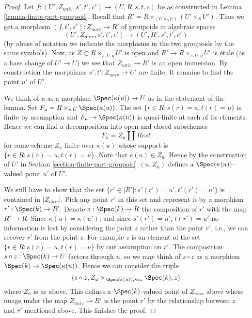 \begin{proof}
Let $f : (U', Z_{univ}, s', t', c') \to (U, R, s, t, c)$ be as constructed in
Lemma \ref{lemma-finite-part-groupoid}.
Recall that $R' = R \times_{(U \times_S U)} (U' \times_S U')$.
Thus we get a morphism $(f, t', s') : Z_{univ} \to R'$ of groupoids
in algebraic spaces
$$
(U', Z_{univ}, s', t', c') \to (U', R', s', t', c')
$$
(by abuse of notation we indicate the morphisms in the two groupoids
by the same symbols). Now, as $Z \subset R \times_{s, U, g} U'$ is open
and $R' \to R \times_{s, U, g} U'$ is \'etale (as a base change
of $U' \to U$) we see that $Z_{univ} \to R'$ is an open immersion.
By construction the morphisms $s', t' : Z_{univ} \to U'$ are finite.
It remains to find the point $u'$ of $U'$.

\medskip\noindent
We think of $u$ as a morphism $\Spec(\kappa(u)) \to U$ as in
the statement of the lemma. Set $F_u = R \times_{s, U} \Spec(\kappa(u))$.
The set $\{r \in R : s(r) = u, t(r) = u\}$ is finite by assumption
and $F_u \to \Spec(\kappa(u))$ is quasi-finite at each
of its elements. Hence we can find a decomposition into open and closed
subschemes
$$
F_u = Z_u \coprod Rest
$$
for some scheme $Z_u$ finite over $\kappa(u)$ whose support is
$\{r \in R : s(r) = u, t(r) = u\}$. Note that $e(u) \in Z_u$.
Hence by the construction of $U'$ in
Section \ref{section-finite-part-groupoid}
$(u, Z_u)$ defines a $\Spec(\kappa(u))$-valued
point $u'$ of $U'$.

\medskip\noindent
We still have to show that the set
$\{r' \in |R'| : s'(r') = u', t'(r') = u'\}$
is contained in $|Z_{univ}|$.
Pick any point $r'$ in this set and represent it by a morphism
$r' : \Spec(k) \to R'$. Denote $z : \Spec(k) \to R$
the composition of $r'$ with the map $R' \to R$.
Since $\kappa(u) = \kappa(u')$, and since $s'(r') = u'$, $t(r') = u'$
no information is lost by considering the point $z$ rather than the
point $r'$, i.e., we can recover $r'$ from the point $z$.
For example $z$ is an element of the set $\{r \in R : s(r) = u, t(r) = u\}$
by our assumption on $r'$. The composition
$s \circ z : \Spec(k) \to U$ factors through $u$, so we may
think of $s \circ z$ as a morphism $\Spec(k) \to \Spec(\kappa(u))$.
Hence we can consider the triple
$$
(s \circ z, Z_u \times_{\Spec(\kappa(u)), s \circ z} \Spec(k), z)
$$
where $Z_u$ is as above. This defines a $\Spec(k)$-valued point
of $Z_{univ}$ above whose image under the map $Z_{univ} \to R'$
is the point $r'$ by the relationship between $z$ and $r'$ mentioned
above. This finishes the proof.
\end{proof}

